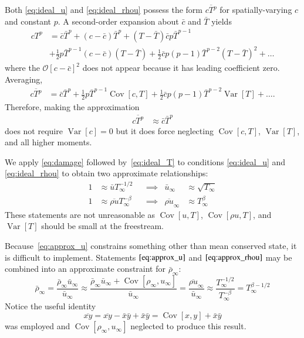 \documentclass[letterpaper,11pt,nointlimits,reqno]{amsart}
\newcommand{\Cov}[2]{\ensuremath{\operatorname{Cov}\left[{#1},{#2}\right]}}
\newcommand{\Var}[1]{\ensuremath{\operatorname{Var}\left[{#1}\right]}}
\begin{document}
Both \eqref{eq:ideal_u} and \eqref{eq:ideal_rhou} possess the form $\overline{c
T^p}$ for spatially-varying $c$ and constant $p$.  A second-order expansion
about $\bar{c}$ and $\bar{T}$ yields
\begin{align}
  c T^p &= \bar{c} \bar{T}^p
         + \left(c - \bar{c}\right) \bar{T}^p
         + \left(T - \bar{T}\right) \bar{c} p \bar{T}^{p-1}
\\      &+ \frac{1}{2} p \bar{T}^{p-1} \left(c - \bar{c}\right)\left(T - \bar{T}\right)
         + \frac{1}{2} \bar{c} p \left(p-1\right) \bar{T}^{p-2} \left(T - \bar{T}\right)^2
         + \dots
\end{align}
where the $\mathcal{O}\left[c - \bar{c}\right]^2$ does not appear because it
has leading coefficient zero.  Averaging,
\begin{align}
  \overline{c T^p} &= \bar{c} \bar{T}^p
                    + \frac{1}{2} p \bar{T}^{p-1} \Cov{c}{T}
                    + \frac{1}{2} \bar{c} p \left(p-1\right) \bar{T}^{p-2} \Var{T}
                    + \dots
.
\end{align}
Therefore, making the approximation
\begin{align}
  \label{eq:damage}
  \overline{c T^p} &\approx \bar{c} \bar{T}^p
\end{align}
does not require $\Var{c} = 0$ but it does force neglecting $\Cov{c}{T}$, $\Var{T}$,
and all higher moments.

We apply \eqref{eq:damage} followed by~\eqref{eq:ideal_T} to conditions
\eqref{eq:ideal_u} and \eqref{eq:ideal_rhou} to obtain two approximate
relationships:
\begin{align}
  \label{eq:approx_u}
  1 &\approx \bar{u} T_\infty^{-1/2}
  & &\implies
  & \bar{u}_\infty &\approx \sqrt{T_\infty}
\\
  \label{eq:approx_rhou}
  1 &\approx \overline{\rho u} T_\infty^{-\beta}
  & &\implies
  & \overline{\rho u}_\infty &\approx T_\infty^\beta
\end{align}
These statements are not unreasonable as $\Cov{u}{T}$, $\Cov{\rho u}{T}$, and
$\Var{T}$ should be small at the freestream.

Because~\eqref{eq:approx_u} constrains something other than mean conserved
state, it is difficult to implement.  Statements $\eqref{eq:approx_u}$ and
$\eqref{eq:approx_rhou}$ may be combined into an approximate constraint for
$\bar{\rho}_\infty$:
\begin{equation}
  \label{eq:approx_rho}
  \bar{\rho}_\infty
  =
  \frac{\bar{\rho}_\infty \bar{u}_\infty}
       {\bar{u}_\infty}
  \approx
  \frac{\bar{\rho}_\infty \bar{u}_\infty + \Cov{\rho_\infty}{u_\infty}}
       {\bar{u}_\infty}
  =
  \frac{\overline{\rho u}_\infty}
       {\bar{u}_\infty}
  \approx
  \frac{T_\infty^{-1/2}}{T_\infty^{-\beta}}
  =
  T_\infty^{\beta-1/2}
\end{equation}
Notice the useful identity
\begin{equation}
  \label{eq:covxy}
  \overline{xy} = \overline{xy} - \bar{x} \bar{y} + \bar{x} \bar{y}
                = \Cov{x}{y} + \bar{x} \bar{y}
\end{equation}
was employed and $\Cov{\rho_\infty}{u_\infty}$ neglected to produce this
result.
\end{document}
